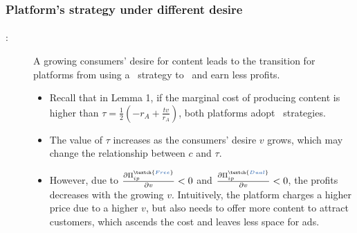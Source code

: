\documentclass{beamer}
\newcommand{\hl}[1]{\textcolor{myblue}{#1}}
\newcommand{\fc}{\textch{\hl{Free-content}}}
\newcommand{\dual}{\textch{\hl{Dual}}}
\newcommand{\free}{\textch{\hl{Free}}}
\newcommand{\Pp}[1]{\text{Proposition #1}}
\begin{document}
\begin{frame}%
    \frametitle{Platform's strategy under different desire}
    \framesubtitle{}
    \begin{description}
        \item[\Pp{1(a)}:] A growing consumers' desire for content
            leads to the transition for platforms from using a \fc\
            strategy to \dual\ and earn less profits.
            \begin{itemize}
                \item Recall that in \hl{Lemma 1},
                    if the marginal cost of producing content is higher than
                    $\tau=\frac{1}{2}\left(-r_A+\frac{tv}{r_A}\right)$,
                    both platforms adopt \fc\ strategies.
                \item The value of $\tau$ increases as the consumers' desire
                    $v$ grows, which may change the relationship between
                    $c$ and $\tau$.
                \item However, due to $\frac{\partial {\Pi_{ip}^\free}}{\partial {v}}<0$
                    and $\frac{\partial {\Pi_{ip}^\dual}}{\partial {v}}<0$,
                    the profits decreases with the growing $v$.
                    Intuitively, the platform charges a higher
                    price due to a higher $v$, but also needs to offer more content
                    to attract customers, which ascends the cost and leaves
                    less space for ads.
            \end{itemize}
    \end{description}
\end{frame}
\end{document}
